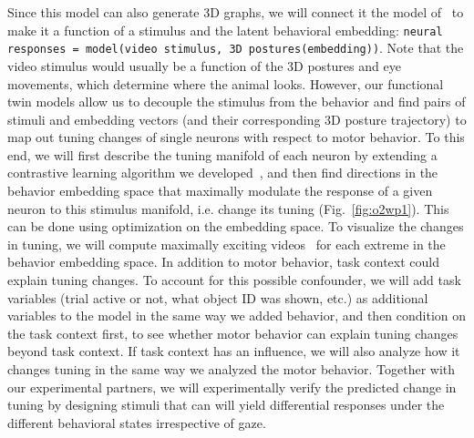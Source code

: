 \documentclass[B2,COG]{ercgrant}
\begin{document}
Since this model can also generate 3D graphs, we will connect it the model of~ to make it a function of a stimulus and the latent behavioral embedding: \texttt{neural responses = model(video stimulus, 3D postures(embedding))}.
Note that the video stimulus would usually be a function of the 3D postures and eye movements, which determine where the animal looks. 
However, our functional twin models allow us to decouple the stimulus from the behavior and find pairs of stimuli and embedding vectors (and their corresponding 3D posture trajectory) to map out tuning changes of single neurons with respect to motor behavior. 
To this end, we will first describe the tuning manifold of each neuron by extending a contrastive learning algorithm we developed~\parencite{Baroni2022-fi}, and then find directions in the behavior embedding space that maximally modulate the response of a given neuron to this stimulus manifold, i.e. change its tuning (Fig.~\ref{fig:o2wp1}).
This can be done using optimization on the embedding space. 
To visualize the changes in tuning, we will compute maximally exciting videos~\parencite{Walker2019-yw} for each extreme in the behavior embedding space. 
In addition to motor behavior, task context could explain tuning changes. 
To account for this possible confounder, we will add task variables (trial active or not, what object ID was shown, etc.) as additional variables to the model in the same way we added behavior, and then condition on the task context first, to see whether motor behavior can explain tuning changes beyond task context. 
If task context has an influence, we will also analyze how it changes tuning in the same way we analyzed the motor behavior. 
Together with our experimental partners, we will experimentally verify the predicted change in tuning by designing stimuli that can will yield differential responses under the different behavioral states irrespective of gaze. 
\end{document}
